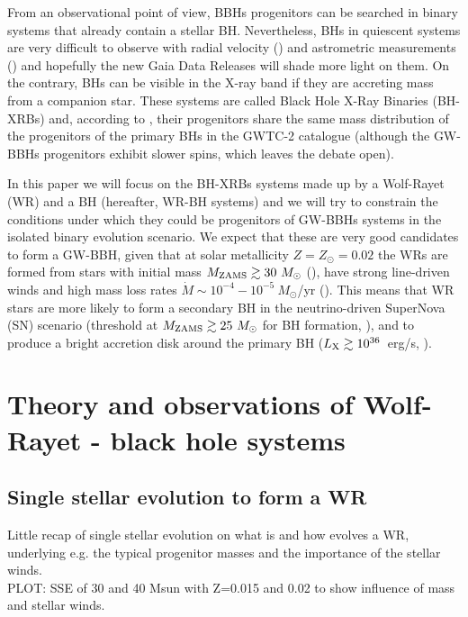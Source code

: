 \documentclass[a4paper,titlepage]{book}     	%
\newcommand{\sun}{\ensuremath{_\odot}}
\newcommand{\mzams}{M_\textup{ZAMS}}
\newcommand{\mdot}{\ensuremath{\dot{M}}}
\newcommand{\msun}{\ensuremath{M\sun}}
\newcommand{\zsun}{\ensuremath{Z\sun}}
\begin{document}
From an observational point of view, BBHs progenitors can be searched in binary systems that already contain a stellar BH. Nevertheless, BHs in quiescent systems are very difficult to observe with radial velocity (\cite{BHradialvelocity}) and astrometric measurements (\cite{GaiaDR2microlensing}) and hopefully the new Gaia Data Releases will shade more light on them. On the contrary, BHs can be visible in the X-ray band if they are accreting mass from a companion star. These systems are called Black Hole X-Ray Binaries (BH-XRBs) and, according to \cite{HMXBH_spins2021}, their progenitors share the same mass distribution of the progenitors of the primary BHs in the GWTC-2 catalogue (although the GW-BBHs progenitors exhibit slower spins, which leaves the debate open).



In this paper we will focus on the BH-XRBs systems made up by a Wolf-Rayet (WR) and a BH (hereafter, WR-BH systems) and we will try to constrain the conditions under which they could be progenitors of GW-BBHs systems in the isolated binary evolution scenario. We expect that these are very good candidates to form a GW-BBH, given that at solar metallicity $Z=\zsun=0.02$ the WRs are formed from stars with initial mass $\mzams \gtrsim 30~\msun$ (\cite{Limongi2010_preSNevo}), have strong line-driven winds and high mass loss rates $\mdot \sim 10^{-4}-10^{-5}~\msun$/yr (\cite{G&H_WRmassloss}). This means that WR stars are more likely to form a secondary BH in the neutrino-driven SuperNova (SN) scenario (threshold at $\mzams \gtrsim 25~\msun$ for BH formation, \cite{Sukhbold2016_stellarevo}), and to produce a bright accretion disk around the primary BH ($L_\textup{X} \gtrsim 10^{36}$~erg/s, \cite{Tutukov2013_WRBHreview}).





\chapter{Theory and observations of Wolf-Rayet - black hole systems}
\section{Single stellar evolution to form a WR}
Little recap of single stellar evolution on what is and how evolves a WR, underlying e.g. the typical progenitor masses and the importance of the stellar winds.\\


PLOT: SSE of 30 and 40 Msun with Z=0.015 and 0.02 to show influence of mass and stellar winds.
\end{document}
